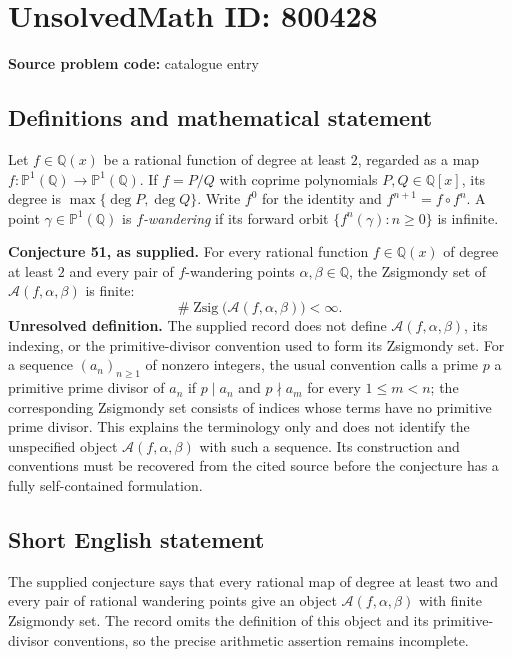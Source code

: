 \documentclass[11pt]{article}
\newcommand{\Q}{\mathbb{Q}}
\newcommand{\PP}{\mathbb{P}}
\begin{document}
\section*{UnsolvedMath ID: 800428}
\textbf{Source problem code:} catalogue entry
\subsection{Definitions and mathematical statement}
Let \(f\in\Q(x)\) be a rational function of degree at least \(2\), regarded as a map \(f:\PP^1(\Q)\to\PP^1(\Q)\). If \(f=P/Q\) with coprime polynomials \(P,Q\in\Q[x]\), its degree is \(\max\{\deg P,\deg Q\}\). Write \(f^0\) for the identity and \(f^{n+1}=f\circ f^n\). A point \(\gamma\in\PP^1(\Q)\) is \emph{\(f\)-wandering} if its forward orbit \(\{f^n(\gamma):n\geq 0\}\) is infinite.

\textbf{Conjecture 51, as supplied.} For every rational function \(f\in\Q(x)\) of degree at least \(2\) and every pair of \(f\)-wandering points \(\alpha,\beta\in\Q\), the Zsigmondy set of \(\mathcal A(f,\alpha,\beta)\) is finite:
\[
\#\operatorname{Zsig}\bigl(\mathcal A(f,\alpha,\beta)\bigr)<\infty.
\]
\textbf{Unresolved definition.} The supplied record does not define \(\mathcal A(f,\alpha,\beta)\), its indexing, or the primitive-divisor convention used to form its Zsigmondy set. For a sequence \((a_n)_{n\geq 1}\) of nonzero integers, the usual convention calls a prime \(p\) a primitive prime divisor of \(a_n\) if \(p\mid a_n\) and \(p\nmid a_m\) for every \(1\leq m<n\); the corresponding Zsigmondy set consists of indices whose terms have no primitive prime divisor. This explains the terminology only and does not identify the unspecified object \(\mathcal A(f,\alpha,\beta)\) with such a sequence. Its construction and conventions must be recovered from the cited source before the conjecture has a fully self-contained formulation.
\subsection{Short English statement}
The supplied conjecture says that every rational map of degree at least two and every pair of rational wandering points give an object \(\mathcal A(f,\alpha,\beta)\) with finite Zsigmondy set. The record omits the definition of this object and its primitive-divisor conventions, so the precise arithmetic assertion remains incomplete.
\end{document}

